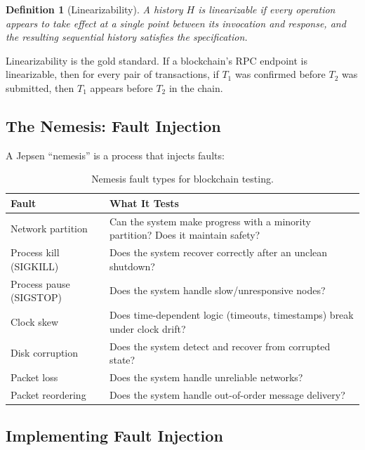 \documentclass[11pt,a4paper]{article}
\newtheorem{definition}{Definition}
\begin{document}
\begin{definition}[Linearizability]
A history $H$ is linearizable if every operation appears to take effect at a single
point between its invocation and response, and the resulting sequential history satisfies
the specification.
\end{definition}

Linearizability is the gold standard. If a blockchain's RPC endpoint is linearizable,
then for every pair of transactions, if $T_1$ was confirmed before $T_2$ was submitted,
then $T_1$ appears before $T_2$ in the chain.

\subsection{The Nemesis: Fault Injection}

A Jepsen ``nemesis'' is a process that injects faults:

\begin{table}[H]
\centering
\small
\begin{tabular}{@{}lp{8cm}@{}}
\toprule
\textbf{Fault} & \textbf{What It Tests} \\
\midrule
Network partition & Can the system make progress with a minority partition? Does it maintain safety? \\
Process kill (SIGKILL) & Does the system recover correctly after an unclean shutdown? \\
Process pause (SIGSTOP) & Does the system handle slow/unresponsive nodes? \\
Clock skew & Does time-dependent logic (timeouts, timestamps) break under clock drift? \\
Disk corruption & Does the system detect and recover from corrupted state? \\
Packet loss & Does the system handle unreliable networks? \\
Packet reordering & Does the system handle out-of-order message delivery? \\
\bottomrule
\end{tabular}
\caption{Nemesis fault types for blockchain testing.}
\end{table}

\subsection{Implementing Fault Injection}
\end{document}
